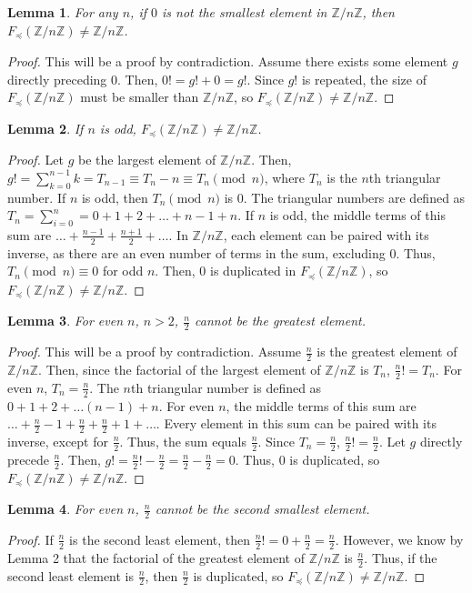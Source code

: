 \documentclass{article}
\newcommand{\ZZ}{\mathbb{Z}}
\newcommand{\ZnZ}{\ZZ/n\ZZ}
\newcommand{\FZ}{F_{\preceq}\left(\ZZ/n\ZZ\right)}
\newtheorem{lemma}{Lemma}
\begin{document}
\begin{lemma}\label{oddlemma}
For any $n$, if $0$ is not the smallest element in $\ZnZ$, then $\FZ \neq \ZnZ$. 
\end{lemma}
\begin{proof}
This will be a proof by contradiction. Assume there exists some element $g$ directly preceding 0. Then, $0! = g! + 0 = g!$. Since $g!$ is repeated, the size of $\FZ$ must be smaller than $\ZnZ$, so $\FZ \neq \ZnZ$. 
\end{proof}
\begin{lemma}
If $n$ is odd, $\FZ \neq \ZnZ$. 
\end{lemma}
\begin{proof}
Let $g$ be the largest element of $\ZnZ$. Then, $g! = \sum_{k=0}^{n-1} k = T_{n-1} \equiv T_n - n \equiv T_n \pmod{n}$, where $T_n$ is the $n$th triangular number. If $n$ is odd, then $T_n \pmod{n}$ is 0. The triangular numbers are defined as $T_n = \sum_{i=0}^{n} = 0 + 1 + 2 + \ldots + n-1 + n$. If $n$ is odd, the middle terms of this sum are $\ldots + \frac{n-1}{2} + \frac{n+1}{2} + \ldots$. In $\ZnZ$, each element can be paired with its inverse, as there are an even number of terms in the sum, excluding 0. Thus, $T_n \pmod{n} \equiv 0$ for odd $n$. Then, 0 is duplicated in $\FZ$, so $\FZ \neq \ZnZ$.
\end{proof} 
\begin{lemma}
For even $n$, $n>2$, $\frac{n}{2}$ cannot be the greatest element.
\end{lemma}
\begin{proof}
This will be a proof by contradiction. Assume $\frac{n}{2}$ is the greatest element of $\ZnZ$. Then, since the factorial of the largest element of $\ZnZ$ is $T_n$, $\frac{n}{2}! = T_n$. For even $n$, $T_n = \frac{n}{2}$. The $n$th triangular number is defined as $0 + 1 + 2 + \ldots (n-1) + n$. For even $n$, the middle terms of this sum are $\ldots + \frac{n}{2}-1 + \frac{n}{2} + \frac{n}{2}+1 + \ldots$. Every element in this sum can be paired with its inverse, except for $\frac{n}{2}$. Thus, the sum equals $\frac{n}{2}$. Since $T_n = \frac{n}{2}$, $\frac{n}{2}! = \frac{n}{2}$. Let $g$ directly precede $\frac{n}{2}$. Then, $g! = \frac{n}{2}! - \frac{n}{2} = \frac{n}{2}-\frac{n}{2} = 0$. Thus, 0 is duplicated, so $\FZ \neq \ZnZ$. 
\end{proof}
\begin{lemma}
For even $n$, $\frac{n}{2}$ cannot be the second smallest element.
\end{lemma}
\begin{proof}
If $\frac{n}{2}$ is the second least element, then $\frac{n}{2}! = 0 + \frac{n}{2} = \frac{n}{2}$. However, we know by Lemma 2 that the factorial of the greatest element of $\ZnZ$ is $\frac{n}{2}$. Thus, if the second least element is $\frac{n}{2}$, then $\frac{n}{2}$ is duplicated, so $\FZ \neq \ZnZ$.
\end{proof}
\end{document}
